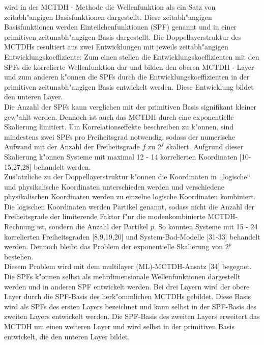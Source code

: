 wird in der MCTDH - Methode die Wellenfunktion als ein Satz von zeitabh"angigen Basisfunktionen dargestellt.
Diese zeitabh"angigen Basisfunktionen werden Einteilchenfunktionen (SPF) genannt und in einer primitiven zeitunabh"angigen Basis dargestellt.
Die Doppellayerstruktur des MCTDHs resultiert aus zwei Entwicklungen mit jeweils zeitabh"angigen Entwicklungskoeffiziente:
Zum einen stellen die Entwicklungskoeffizienten mit den SPFs die korrelierte Wellenfunktion dar und bilden den oberen MCTDH -
Layer und zum anderen k"onnen die SPFs durch die Entwicklungskoeffizienten in der primitiven zeitunabh"angigen Basis entwickelt werden. Diese Entwicklung bildet
den unteren Layer. \cite{Mreview2}
  \\ Die Anzahl der SPFs kann verglichen mit der primitiven Basis signifikant kleiner gew"ahlt werden.
Dennoch ist auch das MCTDH durch eine exponentielle Skalierung limitiert.
Um Korrelationseffekte beschreiben zu k"onnen, sind mindestens zwei SPFs pro Freiheitsgrad notwendig, sodass der numerische Aufwand mit der Anzahl der
Freiheitsgrade $f$ zu $2^f$ skaliert. Aufgrund dieser Skalierung k"onnen Systeme mit maximal 12 - 14 korrelierten Koordinaten \cite{HM1, HM2, HM4, WWM, WWM2, HM5,
 WMC, BWHHM} [10-15,27,28] behandelt werden.
  \\ Zus"atzliche zu der Doppellayerstruktur k"onnen die Koordinaten in ,,logische`` und physikalische Koordinaten unterschieden werden und
verschiedene physikalischen Koordinaten werden zu einzelne logische Koordinaten kombiniert. Die logischen Koordinaten werden Partikel genannt, sodass
nicht die Anzahl der Freiheitsgrade der limiterende Faktor f"ur die modenkombinierte MCTDH-Rechnung ist,
sondern die Anzahl der Partikel $p$. So konnten Systeme mit 15 - 24 korrelierten Freiheitsgraden \cite{H5O2+MCTDH2, H5O2+MCTDH3, RWMC, CWMC} [8,9,19,20] und System-Bad-Modelle [31-33] behandelt werden.
Dennoch bleibt das Problem der exponentielle Skalierung von $2^p$ bestehen.
  \\Diesem Problem wird mit dem multilayer (ML)-MCTDH-Ansatz \cite{WT3} [34] begegnet.
Die SPFs k"onnen selbst als mehrdimensionale Wellenfunktionen dargestellt werden und in anderen SPF entwickelt werden.
Bei drei Layern wird der obere Layer durch die SPF-Basis des herk"ommlichen MCTDHs gebildet.
Diese Basis wird als SPFs des ersten Layers bezeichnet und kann selbst in der SPF-Basis des zweiten Layers entwickelt werden.
Die SPF-Basis des zweiten Layers erweitert das MCTDH um einen weiteren Layer und wird selbst in der primitiven Basis entwickelt, die den unteren Layer bildet.
